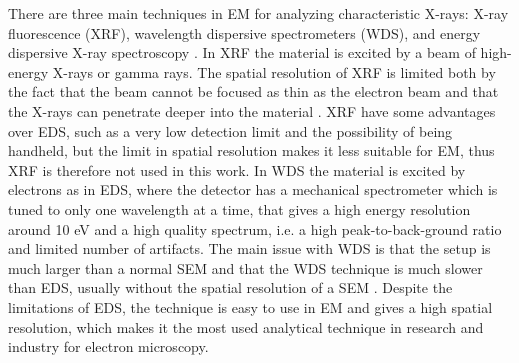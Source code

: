 There are three main techniques in EM for analyzing characteristic X-rays: X-ray fluorescence (XRF), wavelength dispersive spectrometers (WDS), and energy dispersive X-ray spectroscopy \cite{jenkins_xrayspectroscopy}.
In XRF the material is excited by a beam of high-energy X-rays or gamma rays.
The spatial resolution of XRF is limited both by the fact that the beam cannot be focused as thin as the electron beam and that the X-rays can penetrate deeper into the material \cite{xrf_spatial_resolution}.
XRF have some advantages over EDS, such as a very low detection limit and the possibility of being handheld, but the limit in spatial resolution makes it less suitable for EM, thus XRF is therefore not used in this work.
In WDS the material is excited by electrons as in EDS, where the detector has a mechanical spectrometer which is tuned to only one wavelength at a time, that gives a high energy resolution around 10 eV and a high quality spectrum, i.e. a high peak-to-back-ground ratio and limited number of artifacts.
The main issue with WDS is that the setup is much larger than a normal SEM and that the WDS technique is much slower than EDS, usually without the spatial resolution of a SEM \cite{goldstein_scanning_2018}.
Despite the limitations of EDS, the technique is easy to use in EM and gives a high spatial resolution, which makes it the most used analytical technique in research and industry for electron microscopy.






